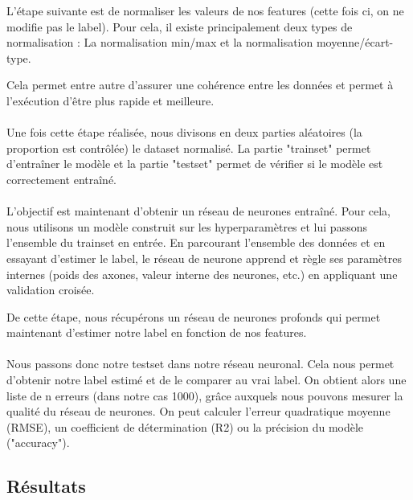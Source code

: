 L'étape suivante est de normaliser les valeurs de nos features (cette fois ci, on ne modifie pas le label). Pour cela, il existe principalement deux types de normalisation : La normalisation min/max et la normalisation moyenne/écart-type.

Cela permet entre autre d'assurer une cohérence entre les données et permet à l'exécution d'être plus rapide et meilleure.


\paragraph{}

Une fois cette étape réalisée, nous divisons en deux parties aléatoires (la proportion est contrôlée) le dataset normalisé. La partie "trainset" permet d'entraîner le modèle et la partie "testset" permet de vérifier si le modèle est correctement entraîné.

\paragraph{}

L'objectif est maintenant d'obtenir un réseau de neurones entraîné. Pour cela, nous utilisons un modèle construit sur les hyperparamètres et lui passons l'ensemble du trainset en entrée. En parcourant l'ensemble des données et en essayant d'estimer le label, le réseau de neurone apprend et règle ses paramètres internes (poids des axones, valeur interne des neurones, etc.) en appliquant une validation croisée.

De cette étape, nous récupérons un réseau de neurones profonds qui permet maintenant d'estimer notre label en fonction de nos features.


\paragraph{}

Nous passons donc notre testset dans notre réseau neuronal. Cela nous permet d'obtenir notre label estimé et de le comparer au vrai label. On obtient alors une liste de n erreurs (dans notre cas 1000), grâce auxquels nous pouvons mesurer la qualité du réseau de neurones. On peut calculer l'erreur quadratique moyenne (RMSE), un coefficient de détermination (R2) ou la précision du modèle ("accuracy").

\subsection{Résultats}

